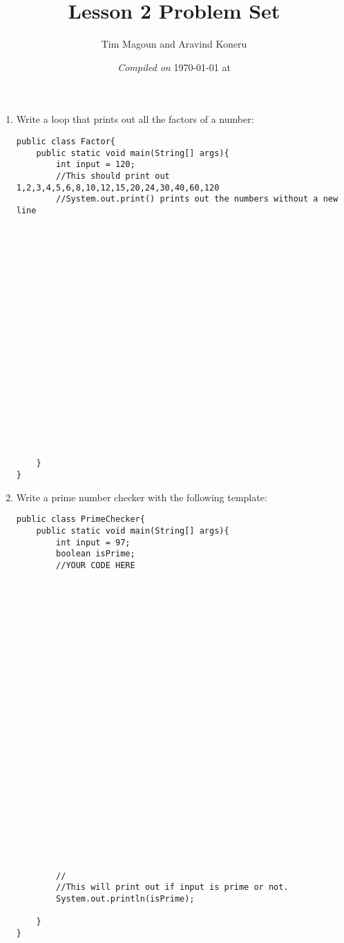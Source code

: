 \documentclass[11pt,fleqn]{article}
\begin{document}
\title{Lesson 2 Problem Set}%
\author{Tim Magoun and Aravind Koneru}
\date{\textit{Compiled on} \today \hspace{1mm} at \currenttime}
\maketitle

\begin{enumerate}
\item Write a loop that prints out all the factors of a number:
\begin{verbatim}
public class Factor{
	public static void main(String[] args){
		int input = 120;
		//This should print out 1,2,3,4,5,6,8,10,12,15,20,24,30,40,60,120
		//System.out.print() prints out the numbers without a new line
		
		
		
		
		
		
		
		
		
		
		
		
		
		
		
		
		
		
		
		
		
	}
}
\end{verbatim}
\newpage
\item Write a prime number checker with the following template:
\begin{verbatim}
public class PrimeChecker{
	public static void main(String[] args){
		int input = 97;
		boolean isPrime;		
		//YOUR CODE HERE
		
		
		
		
		










		
		
		
		
		
		
		
		
		
		
		
		//
		//This will print out if input is prime or not.
		System.out.println(isPrime); 
	
	}
}
\end{verbatim}

\end{enumerate}
\end{document}
